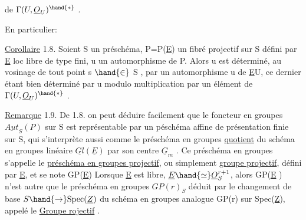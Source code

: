 
de $\Gamma(U,\underline{O}_U)^{\hand{*}}$ .

En particulier:

\uline{Corollaire} 1.8. Soient S un préschéma, P=P(\underline{E}) un fibré projectif sur S
défini par \underline{E} loc libre de type fini, u un automorphisme de P. Alors u
est déterminé, au vosinage de tout point s $\hand{\in}$ S , par un automorphisme
u de \underline{E}\hand{|}U, ce dernier étant bien déterminé par u modulo multiplication par
un élément de $\Gamma(U,\underline{O}_U)^{\hand{*}}$ .

\uline{Remarque} 1.9. De 1.8. on  peut déduire facilement que le foncteur 
 en groupes $\underline{Aut}_S(P)$ sur S est représentable par un péschéma affine
de présentation finie sur S, qui s'interprète aussi comme le préschéma en
groupes \uline{quotient} du schéma en groupes linéaire $\underline{Gl}(\underline{E})$ par son centre
$\underline{G}_m$ . Ce préschéma en groupes s'appelle 
le \uline{préschéma en groupes projectif}, ou simplement \uline{groupe projectif}, défini
par \underline{E}, et se note GP(\underline{E})\hand{,} Lorsque \underline{E} est libre, $\underline{E}\hand{\simeq}\underline{O}_S^{r+1}$, alors GP(\underline{E} ) n'est autre que le
 préschéma en groupes $GP(r)_S$ déduit par le changement de base
$S\hand{\to}\mathrm{Spec}(\underline{Z})$  du schéma en groupes analogue GP(r) sur Spec(\underline{Z}), appelé
le \uline{Groupe rojectif} .

